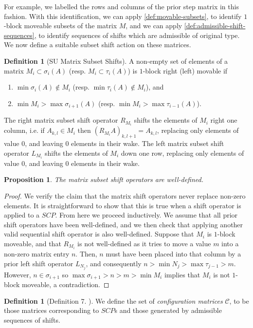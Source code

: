 \documentclass{amsart}
\newtheorem{proposition}[theorem]{Proposition}
\theoremstyle{definition}
\newtheorem{definition}[theorem]{Definition}
\begin{document}
For example, we labelled the rows and columns of the prior step matrix in this fashion.
With this identification, we can apply \cref{def:movable-subsets}, to identify $1$-block moveable subsets of the matrix $M$, and we can apply \cref{def:admissible-shift-sequences}, to identify sequences of shifts which are admissible of original type.
We now define a suitable subset shift action on these matrices.
\begin{definition} [SU Matrix Subset Shifts]
A non-empty set of elements of a matrix $M_i \subset \sigma_i(A)$ (resp. $M_{i}\subset \tau_{i}(A)$) is $1$-block right (left) movable if
\begin{enumerate}
    \item $\min \sigma_i(A) \notin M_i$ (resp. $\min \tau_{i}(A) \notin M_i$), and
    \item $\min M_i> \max \sigma_{i+1}(A)$ (resp. $\min M_{i}> \max \tau_{i-1}(A)$).
\end{enumerate}
The right matrix subset shift operator $R_{M_i}$ shifts the elements of $M_i$ right one column, i.e. if $A_{k,l} \in M_i$ then $(R_{M_i}A)_{k,l+1} = A_{k,l}$, replacing only elements of value $0$, and leaving $0$ elements in their wake.
The left matrix subset shift operator $L_{M_i}$ shifts the elements of $M_i$ down one row, replacing only elements of value $0$, and leaving $0$ elements in their wake.
\end{definition}
\begin{proposition}
The matrix subset shift operators are well-defined.
\end{proposition}
\begin{proof}
We verify the claim that the matrix shift operators never replace non-zero elements.
It is straightforward to show that this is true when a shift operator is applied to a $SCP$.
From here we proceed inductively.
We assume that all prior shift operators have been well-defined, and we then check that applying another valid sequential shift operator is also well-defined.
Suppose that $M_i$ is $1$-block moveable, and that $R_{M_i}$ is not well-defined as it tries to move a value $m$ into a non-zero matrix entry $n$.
Then, $n$ must have been placed into that column by a prior left shift operator $L_{N_j}$, and consequently $n>\min N_j > \max \tau_{j-1}> m$.
However, $n\in \sigma_{i+1}$ so $\max \sigma_{i+1}>n>m>\min M_i $ implies that $M_i$ is not $1$-block moveable, a contradiction.
\end{proof}


\begin{definition}[Definition 7. \cite{SaneblidzeUmble04}]
We define the set of \emph{configuration matrices} $\mathcal{C}$, to be those matrices  corresponding to $SCP$s and those generated by admissible sequences of shifts.
\end{definition}
\end{document}
